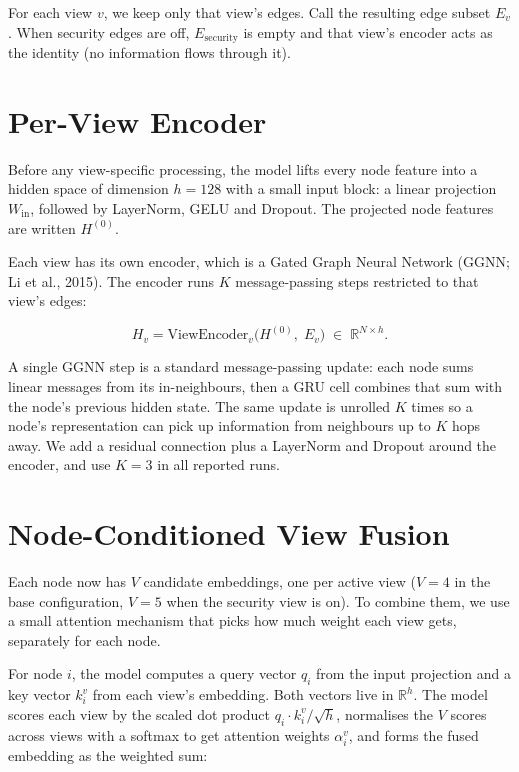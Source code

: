 \documentclass[11pt]{article}
\begin{document}
For each view $v$, we keep only that view's edges. Call the resulting
edge subset $E_v$. When security edges are off, $E_{\text{security}}$
is empty and that view's encoder acts as the identity (no information
flows through it).

\section{Per-View Encoder}

Before any view-specific processing, the model lifts every node feature
into a hidden space of dimension $h = 128$ with a small input block: a
linear projection $W_{\text{in}}$, followed by LayerNorm, GELU and
Dropout. The projected node features are written $H^{(0)}$.

Each view has its own encoder, which is a Gated Graph Neural Network
(GGNN; Li et al., 2015). The encoder runs $K$ message-passing steps
restricted to that view's edges:

\[
H_v = \text{ViewEncoder}_v\bigl(H^{(0)},\; E_v\bigr)
\;\in\; \mathbb{R}^{N \times h}.
\]

A single GGNN step is a standard message-passing update: each node
sums linear messages from its in-neighbours, then a GRU cell combines
that sum with the node's previous hidden state. The same update is
unrolled $K$ times so a node's representation can pick up information
from neighbours up to $K$ hops away. We add a residual connection
plus a LayerNorm and Dropout around the encoder, and use $K = 3$ in
all reported runs.

\section{Node-Conditioned View Fusion}

Each node now has $V$ candidate embeddings, one per active view
($V = 4$ in the base configuration, $V = 5$ when the security view is
on). To combine them, we use a small attention mechanism that picks
how much weight each view gets, separately for each node.

For node $i$, the model computes a query vector $q_i$ from the input
projection and a key vector $k_i^{v}$ from each view's embedding.
Both vectors live in $\mathbb{R}^{h}$. The model scores each view by
the scaled dot product $q_i \cdot k_i^{v} / \sqrt{h}$, normalises the
$V$ scores across views with a softmax to get attention weights
$\alpha_i^{v}$, and forms the fused embedding as the weighted sum:
\end{document}

